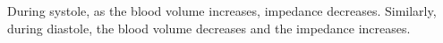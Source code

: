 During systole, as the blood volume increases, impedance decreases. Similarly, during diastole, the blood volume decreases and the impedance increases.


\begin{figure}%
	\centering
	
	\hspace{8pt}%
	\hspace{8pt}%
	 \\

\end{figure}
